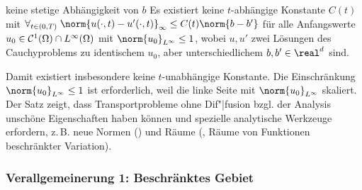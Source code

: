 \linie

\begin{Satz}{keine stetige Abhängigkeit von $b$}
    Es existiert keine $t$-abhängige Konstante $C(t)$ mit
    $\forall_{t \in (0, T)}\;
    \norm{u(\cdot, t) - u'(\cdot, t)}_\infty \le C(t) \norm{b - b'}$
    für alle Anfangswerte $u_0 \in \mathcal{C}^1(\Omega) \cap L^\infty(\Omega)$ mit
    $\norm{u_0}_{L^\infty} \le 1$,
    wobei $u, u'$ zwei Lösungen des Cauchyproblems zu identischem $u_0$, aber unterschiedlichem
    $b, b' \in \real^d$ sind.
\end{Satz}

\begin{Bem}
    Damit existiert insbesondere keine $t$-unabhängige Konstante.
    Die Einschränkung $\norm{u_0}_{L^\infty} \le 1$ ist erforderlich, weil die linke Seite mit
    $\norm{u_0}_{L^\infty}$ skaliert.
    Der Satz zeigt, dass Transportprobleme ohne Dif"|fusion bzgl. der Analysis unschöne
    Eigenschaften haben können und spezielle analytische Werkzeuge erfordern,
    z.\,B. neue Normen () und Räume (,
    Räume von Funktionen beschränkter Variation).
\end{Bem}

\subsubsection{%
    Verallgemeinerung 1: Beschränktes Gebiet%
}

